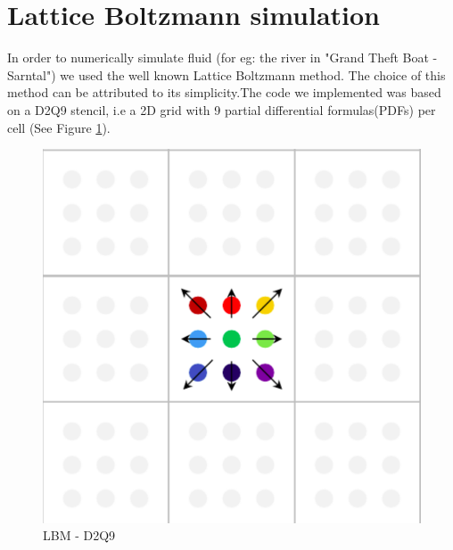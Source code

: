 \section{Lattice Boltzmann simulation}
In order to numerically simulate fluid (for eg: the river in "Grand Theft Boat - Sarntal") we used the well known Lattice Boltzmann method. The choice
of this method can be attributed to its simplicity.The code we implemented was based on a D2Q9 stencil, i.e a 2D grid with 9 partial differential formulas(PDFs) per cell (See Figure \ref{fig: D2Q9 push scheme}). 

	
\begin{figure} [h]
\centering
\includegraphics[scale=0.4]{img/LBM/D2Q9_push}
\caption{LBM - D2Q9}
\label{fig: D2Q9 push scheme}
\end{figure}

